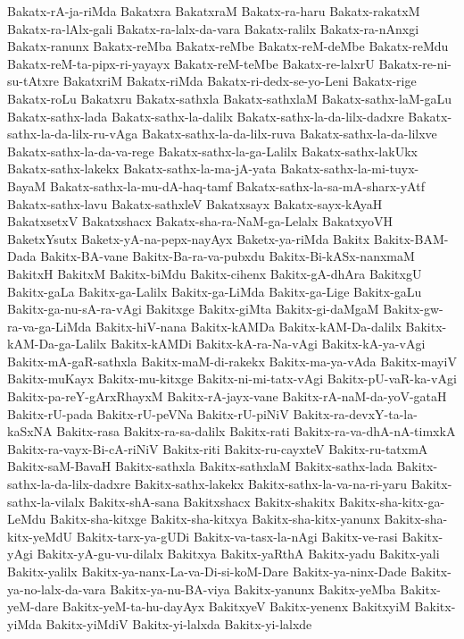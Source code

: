 {Bakatx-rA-ja-riMda
Bakatxra
BakatxraM
Bakatx-ra-haru
Bakatx-rakatxM
Bakatx-ra-lAlx-gali
Bakatx-ra-lalx-da-vara
Bakatx-ralilx
Bakatx-ra-nAnxgi
Bakatx-ranunx
Bakatx-reMba
Bakatx-reMbe
Bakatx-reM-deMbe
Bakatx-reMdu
Bakatx-reM-ta-pipx-ri-yayayx
Bakatx-reM-teMbe
Bakatx-re-lalxrU
Bakatx-re-ni-su-tAtxre
BakatxriM
Bakatx-riMda
Bakatx-ri-dedx-se-yo-Leni
Bakatx-rige
Bakatx-roLu
Bakatxru
Bakatx-sathxla
Bakatx-sathxlaM
Bakatx-sathx-laM-gaLu
Bakatx-sathx-lada
Bakatx-sathx-la-dalilx
Bakatx-sathx-la-da-lilx-dadxre
Bakatx-sathx-la-da-lilx-ru-vAga
Bakatx-sathx-la-da-lilx-ruva
Bakatx-sathx-la-da-lilxve
Bakatx-sathx-la-da-va-rege
Bakatx-sathx-la-ga-Lalilx
Bakatx-sathx-lakUkx
Bakatx-sathx-lakekx
Bakatx-sathx-la-ma-jA-yata
Bakatx-sathx-la-mi-tuyx-BayaM
Bakatx-sathx-la-mu-dA-haq-tamf
Bakatx-sathx-la-sa-mA-sharx-yAtf
Bakatx-sathx-lavu
Bakatx-sathxleV
Bakatxsayx
Bakatx-sayx-kAyaH
BakatxsetxV
Bakatxshacx
Bakatx-sha-ra-NaM-ga-Lelalx
BakatxyoVH
BaketxYsutx
Baketx-yA-na-pepx-nayAyx
Baketx-ya-riMda
Bakitx
Bakitx-BAM-Dada
Bakitx-BA-vane
Bakitx-Ba-ra-va-pubxdu
Bakitx-Bi-kASx-nanxmaM
BakitxH
BakitxM
Bakitx-biMdu
Bakitx-cihenx
Bakitx-gA-dhAra
BakitxgU
Bakitx-gaLa
Bakitx-ga-Lalilx
Bakitx-ga-LiMda
Bakitx-ga-Lige
Bakitx-gaLu
Bakitx-ga-nu-sA-ra-vAgi
Bakitxge
Bakitx-giMta
Bakitx-gi-daMgaM
Bakitx-gw-ra-va-ga-LiMda
Bakitx-hiV-nana
Bakitx-kAMDa
Bakitx-kAM-Da-dalilx
Bakitx-kAM-Da-ga-Lalilx
Bakitx-kAMDi
Bakitx-kA-ra-Na-vAgi
Bakitx-kA-ya-vAgi
Bakitx-mA-gaR-sathxla
Bakitx-maM-di-rakekx
Bakitx-ma-ya-vAda
Bakitx-mayiV
Bakitx-muKayx
Bakitx-mu-kitxge
Bakitx-ni-mi-tatx-vAgi
Bakitx-pU-vaR-ka-vAgi
Bakitx-pa-reY-gArxRhayxM
Bakitx-rA-jayx-vane
Bakitx-rA-naM-da-yoV-gataH
Bakitx-rU-pada
Bakitx-rU-peVNa
Bakitx-rU-piNiV
Bakitx-ra-devxY-ta-la-kaSxNA
Bakitx-rasa
Bakitx-ra-sa-dalilx
Bakitx-rati
Bakitx-ra-va-dhA-nA-timxkA
Bakitx-ra-vayx-Bi-cA-riNiV
Bakitx-riti
Bakitx-ru-cayxteV
Bakitx-ru-tatxmA
Bakitx-saM-BavaH
Bakitx-sathxla
Bakitx-sathxlaM
Bakitx-sathx-lada
Bakitx-sathx-la-da-lilx-dadxre
Bakitx-sathx-lakekx
Bakitx-sathx-la-va-na-ri-yaru
Bakitx-sathx-la-vilalx
Bakitx-shA-sana
Bakitxshacx
Bakitx-shakitx
Bakitx-sha-kitx-ga-LeMdu
Bakitx-sha-kitxge
Bakitx-sha-kitxya
Bakitx-sha-kitx-yanunx
Bakitx-sha-kitx-yeMdU
Bakitx-tarx-ya-gUDi
Bakitx-va-tasx-la-nAgi
Bakitx-ve-rasi
Bakitx-yAgi
Bakitx-yA-gu-vu-dilalx
Bakitxya
Bakitx-yaRthA
Bakitx-yadu
Bakitx-yali
Bakitx-yalilx
Bakitx-ya-nanx-La-va-Di-si-koM-Dare
Bakitx-ya-ninx-Dade
Bakitx-ya-no-lalx-da-vara
Bakitx-ya-nu-BA-viya
Bakitx-yanunx
Bakitx-yeMba
Bakitx-yeM-dare
Bakitx-yeM-ta-hu-dayAyx
BakitxyeV
Bakitx-yenenx
BakitxyiM
Bakitx-yiMda
Bakitx-yiMdiV
Bakitx-yi-lalxda
Bakitx-yi-lalxde
}
